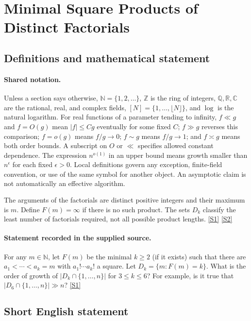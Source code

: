 \documentclass[11pt,a4paper]{article}
\newcommand{\N}{\mathbb{N}}
\newcommand{\Z}{\mathbb{Z}}
\newcommand{\Q}{\mathbb{Q}}
\newcommand{\R}{\mathbb{R}}
\newcommand{\C}{\mathbb{C}}
\newcommand{\sref}[2]{\hyperlink{source:#1:#2}{[S#2]}}
\begin{document}
\section{Minimal Square Products of Distinct Factorials}\label{statement}


\subsection{Definitions and mathematical statement}

\paragraph{Shared notation.}Unless a section says otherwise, $\N=\{1,2,\ldots\}$,
$\Z$ is the ring of integers, $\Q,\R,\C$ are the rational, real, and complex
fields, $[N]=\{1,\ldots,\lfloor N\rfloor\}$, and $\log$ is the natural
logarithm. For real functions of a parameter tending to infinity,
$f\ll g$ and $f=O(g)$ mean $|f|\leq Cg$ eventually for some fixed $C$;
$f\gg g$ reverses this comparison; $f=o(g)$ means $f/g\to0$;
$f\sim g$ means $f/g\to1$; and $f\asymp g$ means both order bounds.
A subscript on $O$ or $\ll$ specifies allowed constant dependence.
The expression $n^{o(1)}$ in an upper bound means growth smaller than
$n^\epsilon$ for each fixed $\epsilon>0$. Local definitions govern any
exception, finite-field convention, or use of the same symbol for another
object. An asymptotic claim is not automatically an effective algorithm.



The arguments of the factorials are distinct positive integers and their maximum is $m$. Define $F(m)=\infty$ if there is no such product. The sets $D_k$ classify the least number of factorials required, not all possible product lengths. \sref{statement}{1} \sref{statement}{2}

\paragraph{Statement recorded in the supplied source.}
For any $m\in \mathbb{N}$, let $F(m)$ be the minimal $k\geq 2$ (if it exists) such that there are $a_1<\cdots <a_k=m$ with $a_1!\cdots a_k!$ a square. Let $D_k=\{ m : F(m)=k\}$. What is the order of growth of $\lvert D_k\cap\{1,\ldots,n\}\rvert$ for $3\leq k\leq 6$? For example, is it true that $\lvert D_6\cap \{1,\ldots,n\}\rvert \gg n$? \sref{statement}{1}

\subsection{Short English statement}
\end{document}
